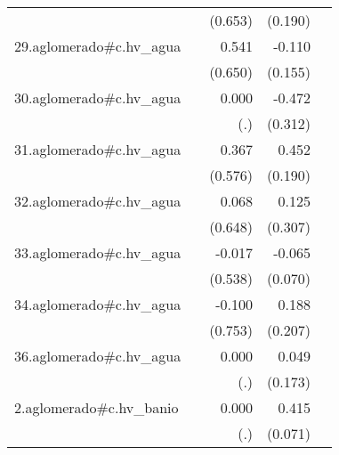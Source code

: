 {\begin{longtable}{l*{4}{D{.}{.}{-1}}}
            &                     &     (0.653)         &     (0.190)         &                     \\
\addlinespace
29.aglomerado#c.hv\_agua&                     &       0.541         &      -0.110         &                     \\
            &                     &     (0.650)         &     (0.155)         &                     \\
\addlinespace
30.aglomerado#c.hv\_agua&                     &       0.000         &      -0.472         &                     \\
            &                     &         (.)         &     (0.312)         &                     \\
\addlinespace
31.aglomerado#c.hv\_agua&                     &       0.367         &       0.452\sym{*}  &                     \\
            &                     &     (0.576)         &     (0.190)         &                     \\
\addlinespace
32.aglomerado#c.hv\_agua&                     &       0.068         &       0.125         &                     \\
            &                     &     (0.648)         &     (0.307)         &                     \\
\addlinespace
33.aglomerado#c.hv\_agua&                     &      -0.017         &      -0.065         &                     \\
            &                     &     (0.538)         &     (0.070)         &                     \\
\addlinespace
34.aglomerado#c.hv\_agua&                     &      -0.100         &       0.188         &                     \\
            &                     &     (0.753)         &     (0.207)         &                     \\
\addlinespace
36.aglomerado#c.hv\_agua&                     &       0.000         &       0.049         &                     \\
            &                     &         (.)         &     (0.173)         &                     \\
\addlinespace
2.aglomerado#c.hv\_banio&                     &       0.000         &       0.415\sym{***}&                     \\
            &                     &         (.)         &     (0.071)         &                     \\

\end{longtable}}
